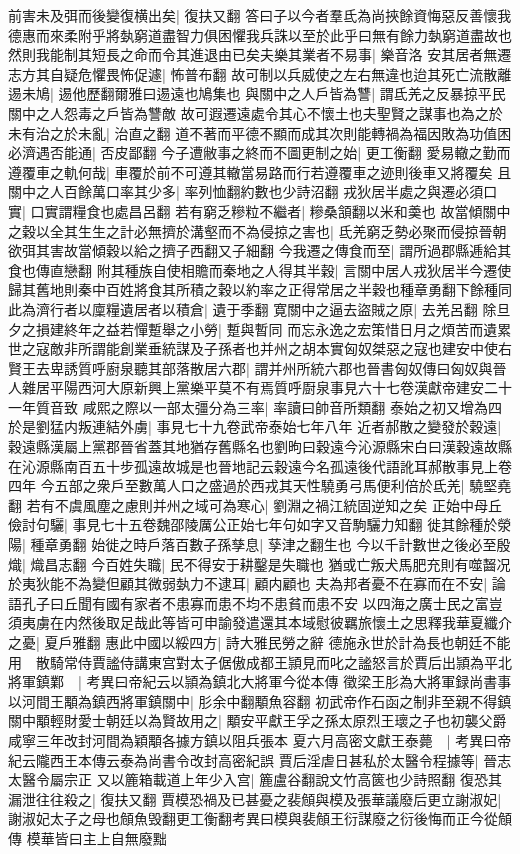 前害未及弭而後變復横出矣|{
	復扶又翻}
答曰子以今者羣氐為尚挾餘資悔惡反善懷我德惠而來柔附乎將埶窮道盡智力俱困懼我兵誅以至於此乎曰無有餘力埶窮道盡故也然則我能制其短長之命而令其進退由已矣夫樂其業者不易事|{
	樂音洛}
安其居者無遷志方其自疑危懼畏怖促遽|{
	怖普布翻}
故可制以兵威使之左右無違也迨其死亡流散離逷未鳩|{
	逷他歷翻爾雅曰逷遠也鳩集也}
與關中之人戶皆為讐|{
	謂氐羌之反暴掠平民關中之人怨毒之戶皆為讐敵}
故可遐遷遠處令其心不懷土也夫聖賢之謀事也為之於未有治之於未亂|{
	治直之翻}
道不著而平德不顯而成其次則能轉禍為福因敗為功值困必濟遇否能通|{
	否皮鄙翻}
今子遭敝事之終而不圖更制之始|{
	更工衡翻}
愛易轍之勤而遵覆車之軌何哉|{
	車覆於前不可遵其轍當易路而行若遵覆車之迹則後車又將覆矣}
且關中之人百餘萬口率其少多|{
	率列恤翻約數也少詩沼翻}
戎狄居半處之與遷必須口實|{
	口實謂糧食也處昌呂翻}
若有窮乏糝粒不繼者|{
	糝桑頷翻以米和羮也}
故當傾關中之穀以全其生生之計必無擠於溝壑而不為侵掠之害也|{
	氐羌窮乏勢必聚而侵掠晉朝欲弭其害故當傾穀以給之擠子西翻又子細翻}
今我遷之傳食而至|{
	謂所過郡縣逓給其食也傳直戀翻}
附其種族自使相贍而秦地之人得其半穀|{
	言關中居人戎狄居半今遷使歸其舊地則秦中百姓將食其所積之穀以約率之正得常居之半穀也種章勇翻下餘種同}
此為濟行者以廩糧遺居者以積倉|{
	遺于季翻}
寛關中之逼去盜賊之原|{
	去羌呂翻}
除旦夕之損建終年之益若憚蹔舉之小勞|{
	蹔與暫同}
而忘永逸之宏策惜日月之煩苦而遺累世之寇敵非所謂能創業垂統謀及子孫者也并州之胡本實匈奴桀惡之寇也建安中使右賢王去卑誘質呼廚泉聽其部落散居六郡|{
	謂并州所統六郡也晉書匈奴傳曰匈奴與晉人雜居平陽西河大原新興上黨樂平莫不有焉質呼㕑泉事見六十七卷漢獻帝建安二十一年質音致}
咸熙之際以一部太彊分為三率|{
	率讀曰帥音所類翻}
泰始之初又增為四於是劉猛内叛連結外虜|{
	事見七十九卷武帝泰始七年八年}
近者郝散之變發於穀遠|{
	穀遠縣漢屬上黨郡晉省蓋其地猶存舊縣名也劉昫曰穀遠今沁源縣宋白曰漢穀遠故縣在沁源縣南百五十步孤遠故城是也晉地記云穀遠今名孤遠後代語訛耳郝散事見上卷四年}
今五部之衆戶至數萬人口之盛過於西戎其天性驍勇弓馬便利倍於氐羌|{
	驍堅堯翻}
若有不虞風塵之慮則并州之域可為寒心|{
	劉淵之禍江統固逆知之矣}
正始中母丘儉討句驪|{
	事見七十五卷魏邵陵厲公正始七年句如字又音駒驪力知翻}
徙其餘種於滎陽|{
	種章勇翻}
始徙之時戶落百數子孫孳息|{
	孶津之翻生也}
今以千計數世之後必至殷熾|{
	熾昌志翻}
今百姓失職|{
	民不得安于耕鑿是失職也}
猶或亡叛犬馬肥充則有噬齧况於夷狄能不為變但顧其微弱埶力不逮耳|{
	顧内顧也}
夫為邦者憂不在寡而在不安|{
	論語孔子曰丘聞有國有家者不患寡而患不均不患貧而患不安}
以四海之廣士民之富豈須夷虜在内然後取足哉此等皆可申諭發遣還其本域慰彼羈旅懷土之思釋我華夏纖介之憂|{
	夏戶雅翻}
惠此中國以綏四方|{
	詩大雅民勞之辭}
德施永世於計為長也朝廷不能用　散騎常侍賈謐侍講東宫對太子倨傲成都王頴見而叱之謐怒言於賈后出頴為平北將軍鎮鄴　|{
	考異曰帝紀云以頴為鎮北大將軍今從本傳}
徵梁王肜為大將軍録尚書事以河間王顒為鎮西將軍鎮關中|{
	肜余中翻顒魚容翻}
初武帝作石函之制非至親不得鎮關中顒輕財愛士朝廷以為賢故用之|{
	顒安平獻王孚之孫太原烈王瓌之子也初襲父爵咸寧三年改封河間為穎顒各據方鎮以阻兵張本}
夏六月高密文獻王泰薨　|{
	考異曰帝紀云隴西王本傳云泰為尚書令改封高密紀誤}
賈后淫虐日甚私於太醫令程據等|{
	晉志太醫令屬宗正}
又以簏箱載道上年少入宫|{
	簏盧谷翻說文竹高篋也少詩照翻}
復恐其漏泄往往殺之|{
	復扶又翻}
賈模恐禍及已甚憂之裴頠與模及張華議廢后更立謝淑妃|{
	謝淑妃太子之母也頠魚毁翻更工衡翻考異曰模與裴頠王衍謀廢之衍後悔而正今從頠傳}
模華皆曰主上自無廢黜

